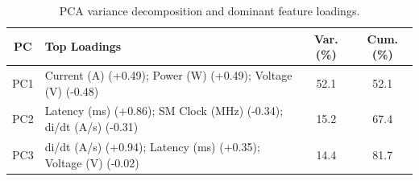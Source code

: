 \begin{table}[t]
\centering
\caption{PCA variance decomposition and dominant feature loadings.}
\label{tab:pca_variance}
\small
\begin{tabular}{clcc}
\toprule
\textbf{PC} & \textbf{Top Loadings} & \textbf{Var. (\%)} & \textbf{Cum. (\%)} \\
\midrule
PC1 & Current (A) (+0.49); Power (W) (+0.49); Voltage (V) (-0.48) & 52.1 & 52.1 \\
PC2 & Latency (ms) (+0.86); SM Clock (MHz) (-0.34); di/dt (A/s) (-0.31) & 15.2 & 67.4 \\
PC3 & di/dt (A/s) (+0.94); Latency (ms) (+0.35); Voltage (V) (-0.02) & 14.4 & 81.7 \\
\bottomrule
\end{tabular}
\end{table}
